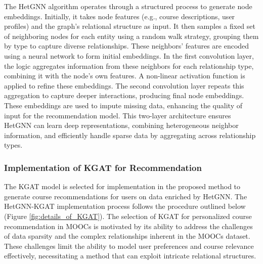 \documentclass{ieeeaccess}
\begin{document}
{The HetGNN algorithm operates through a structured process to generate node embeddings. Initially, it takes node features (e.g., course descriptions, user profiles) and the graph's relational structure as input. It then samples a fixed set of neighboring nodes for each entity using a random walk strategy, grouping them by type to capture diverse relationships. These neighbors' features are encoded using a neural network to form initial embeddings. In the first convolution layer, the logic aggregates information from these neighbors for each relationship type, combining it with the node's own features. A non-linear activation function is applied to refine these embeddings. The second convolution layer repeats this aggregation to capture deeper interactions, producing final node embeddings. These embeddings are used to impute missing data, enhancing the quality of input for the recommendation model. This two-layer architecture ensures HetGNN can learn deep representations, combining heterogeneous neighbor information, and efficiently handle sparse data by aggregating across relationship types.}

\subsubsection{ Implementation of KGAT for Recommendation}
{The KGAT model \cite{wang2019kgat} is selected for implementation in the proposed method to generate course recommendations for users on data enriched by HetGNN. The HetGNN-KGAT implementation process follows the procedure outlined below (Figure \ref{fig:details_of_KGAT}). The selection of KGAT for personalized course recommendation in MOOCs is motivated by its ability to address the challenges of data sparsity and the complex relationships inherent in the MOOCs dataset. These challenges limit the ability to model user preferences and course relevance effectively, necessitating a method that can exploit intricate relational structures.}
\end{document}
